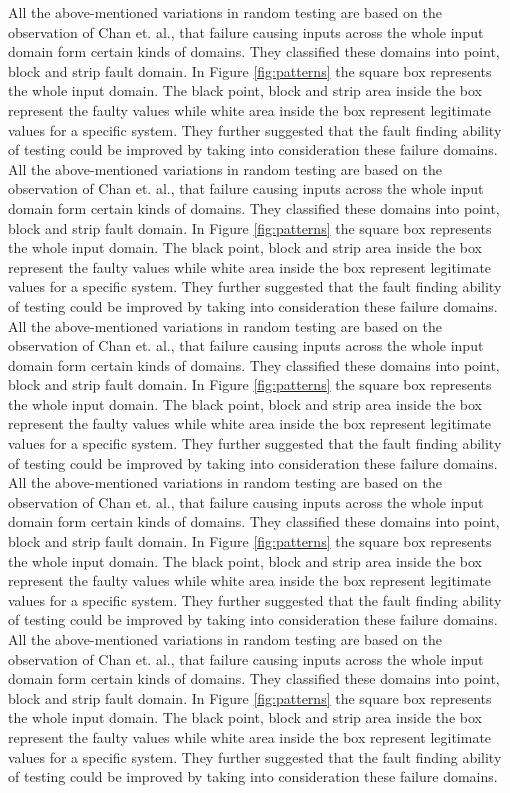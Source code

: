 All the above-mentioned variations in random testing are based on the observation of Chan et. al.,  \cite{Chan1996} that failure causing inputs across the whole input domain form certain kinds of domains. They classified these domains into point, block and strip fault domain. In Figure \ref{fig:patterns} the square box represents the whole input domain. The black point, block and strip area inside the box represent the faulty values while white area inside the box represent legitimate values for a specific system. They further suggested that the fault finding ability of testing could be improved by taking into consideration these failure domains.
All the above-mentioned variations in random testing are based on the observation of Chan et. al.,  \cite{Chan1996} that failure causing inputs across the whole input domain form certain kinds of domains. They classified these domains into point, block and strip fault domain. In Figure \ref{fig:patterns} the square box represents the whole input domain. The black point, block and strip area inside the box represent the faulty values while white area inside the box represent legitimate values for a specific system. They further suggested that the fault finding ability of testing could be improved by taking into consideration these failure domains.
All the above-mentioned variations in random testing are based on the observation of Chan et. al.,  \cite{Chan1996} that failure causing inputs across the whole input domain form certain kinds of domains. They classified these domains into point, block and strip fault domain. In Figure \ref{fig:patterns} the square box represents the whole input domain. The black point, block and strip area inside the box represent the faulty values while white area inside the box represent legitimate values for a specific system. They further suggested that the fault finding ability of testing could be improved by taking into consideration these failure domains.
All the above-mentioned variations in random testing are based on the observation of Chan et. al.,  \cite{Chan1996} that failure causing inputs across the whole input domain form certain kinds of domains. They classified these domains into point, block and strip fault domain. In Figure \ref{fig:patterns} the square box represents the whole input domain. The black point, block and strip area inside the box represent the faulty values while white area inside the box represent legitimate values for a specific system. They further suggested that the fault finding ability of testing could be improved by taking into consideration these failure domains.
All the above-mentioned variations in random testing are based on the observation of Chan et. al.,  \cite{Chan1996} that failure causing inputs across the whole input domain form certain kinds of domains. They classified these domains into point, block and strip fault domain. In Figure \ref{fig:patterns} the square box represents the whole input domain. The black point, block and strip area inside the box represent the faulty values while white area inside the box represent legitimate values for a specific system. They further suggested that the fault finding ability of testing could be improved by taking into consideration these failure domains.